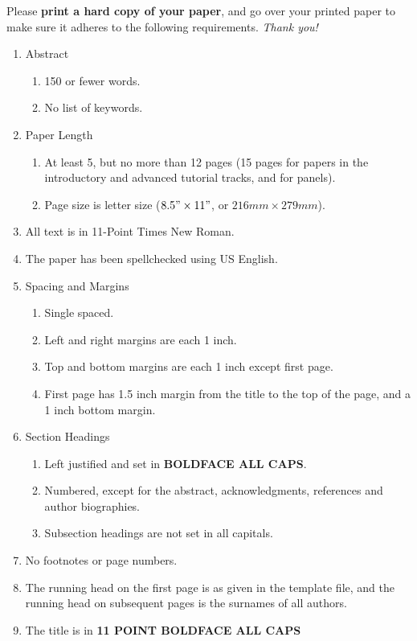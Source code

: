 \documentclass{wscpaperproc}
\theoremstyle{wsc}
\begin{document}
Please {\bf print a hard copy of your paper}, and go over your printed paper to make sure it adheres to the following requirements. {\em Thank you!}
\begin{enumerate}
	\item Abstract
	\begin{enumerate}
		\item 150 or fewer words.
		\item No list of keywords.
	\end{enumerate}
	\item Paper Length
	\begin{enumerate}
		\item At least 5, but no more than 12 pages (15 pages for papers in the introductory and advanced tutorial tracks, and for panels).
	\item Page size is letter size ($8.5" \times 11"$, or $216 mm \times 279 mm$).
	\end{enumerate}
	\item All text is in 11-Point Times New Roman.
	\item The paper has been spellchecked using US English.
	\item Spacing and Margins
	\begin{enumerate}
		\item Single spaced.
		\item Left and right margins are each 1 inch.
		\item Top and bottom margins are each 1 inch except first page.
		\item First page has 1.5 inch margin from the title to the top of the page, and a 1 inch bottom margin.
	\end{enumerate}
	\item Section Headings
	\begin{enumerate}
		\item Left justified and set in {\bf BOLDFACE ALL CAPS}.
		\item Numbered, except for the abstract, acknowledgments, references and author biographies.
		\item Subsection headings are not set in all capitals.
	\end{enumerate}
	\item No footnotes or page numbers.
	\item The running head on the first page is as given in the template file, and the running head on subsequent pages is the surnames of all authors.
	\item The title is in {\bf 11 POINT BOLDFACE ALL CAPS}

\end{enumerate}
\end{document}
